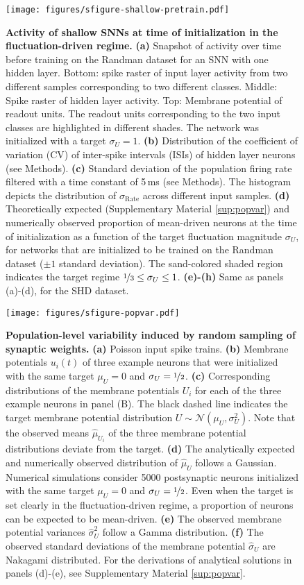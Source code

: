 \documentclass[11pt,a4paper]{article}
\begin{document}
\begin{refsection}
\begin{figure}[htb]
	\texttt{[image: figures/sfigure-shallow-pretrain.pdf]}
\caption{
\textbf{Activity of shallow \acp{SNN} at time of initialization in the fluctuation-driven regime.}
	\textbf{(a)} Snapshot of activity over time before training  on the Randman dataset for an \ac{SNN} with one hidden layer. Bottom: spike raster of input layer activity from two different samples corresponding to two different classes. Middle: Spike raster of hidden layer activity. Top: Membrane potential of readout units. The readout units corresponding to the two input classes are highlighted in different shades. The network was initialized with a target $\sigma_U=1$.
	\textbf{(b)} Distribution of the coefficient of variation (CV) of inter-spike intervals (ISIs) of hidden layer neurons (see Methods).
	\textbf{(c)} Standard deviation of the population firing rate filtered with a time constant of 5\,ms (see Methods). The histogram depicts the distribution of $\sigma_{\mathrm{Rate}}$ across different input samples. 
	\textbf{(d)} Theoretically expected (Supplementary Material \ref{sup:popvar}) and numerically observed proportion of mean-driven neurons at the time of initialization as a function of the target fluctuation magnitude $\sigma_U$, for networks that are initialized to be trained on the Randman dataset ($\pm 1$ standard deviation). The sand-colored shaded region indicates the target regime $\nicefrac{1}{3} \leq \sigma_U \leq 1$.
	\textbf{(e)-(h)} Same as panels (a)-(d), for the SHD dataset.
}
\label{sfig:shallow}
\end{figure}

\begin{figure}[htb]
	\texttt{[image: figures/sfigure-popvar.pdf]}
\caption{\textbf{Population-level variability induced by random sampling of synaptic weights.}
	\textbf{(a)} Poisson input spike trains.
	\textbf{(b)} Membrane potentials $u_i(t)$ of three example neurons that were initialized with the same target $\mu_U=0$ and $\sigma_U=\nicefrac{1}{2}$.
	\textbf{(c)} Corresponding distributions of the membrane potentials $U_i$ for each of the three example neurons in panel (B). The black dashed line indicates the target membrane potential distribution $U \sim \mathcal{N}(\mu_U, \sigma_U^2)$. Note that the observed means $\hat \mu_{U_i}$ of the three
membrane potential distributions deviate from the target.
\textbf{(d)} The analytically expected and numerically observed distribution of $\hat \mu_U$ follows a Gaussian. Numerical simulations consider 5000 postsynaptic neurons initialized with the same target $\mu_U=0$ and $\sigma_U=\nicefrac{1}{2}$. 
Even when the target is set clearly in the fluctuation-driven regime, a proportion of neurons can be expected to be mean-driven.
\textbf{(e)} The observed membrane potential variances $\hat \sigma_U^2$ follow a Gamma distribution.
\textbf{(f)} The observed standard deviations of the membrane potential $\hat \sigma_U$ are Nakagami distributed. For the derivations of analytical solutions in panels (d)-(e), see Supplementary Material \ref{sup:popvar}.
}
\label{sfig:popvar}
\end{figure}


\end{refsection}
\end{document}
